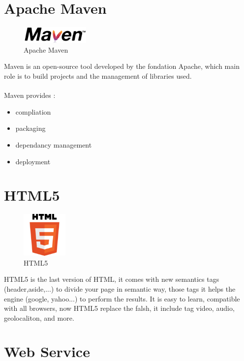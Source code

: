 \section{Apache Maven}
\begin{figure}[h]
	\centering
	\includegraphics[width=0.3\textwidth]{Maven_logo.png}
	\caption{Apache Maven}
\end{figure}
Maven is an open-source tool developed by the fondation Apache, which main role is to build projects and the management of libraries used.
\\
\\
Maven provides :
\begin{itemize}
	\item compliation
	\item packaging
	\item dependancy management
	\item deployment
\end{itemize} 

\clearpage
\newpage

\section{HTML5}
\begin{figure}[h]
	\centering
	\includegraphics[width=0.2\textwidth]{HTML5_logo.png}
	\caption{HTML5}
\end{figure}
HTML5 is the last version of HTML, it comes with new semantics tags (header,aside,...) to divide your page in semantic way, those tags it helps the engine (google, yahoo...) to perform the results. It is easy to learn, compatible with all browsers, now HTML5 replace the falsh, it include tag video, audio, geolocaliton, and more.
\section{Web Service} 
